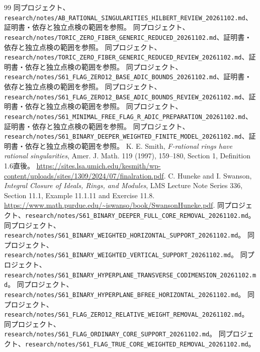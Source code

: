 \documentclass[11pt,a4paper]{ltjsarticle}
\theoremstyle{remark}
\begin{document}
\begin{thebibliography}{99}
 同プロジェクト、\nolinkurl{research/notes/AB_RATIONAL_SINGULARITIES_HILBERT_REVIEW_20261102.md}、証明書・依存と独立点検の範囲を参照。
 同プロジェクト、\nolinkurl{research/notes/TORIC_ZERO_FIBER_GENERIC_REDUCED_20261102.md}、証明書・依存と独立点検の範囲を参照。
 同プロジェクト、\nolinkurl{research/notes/TORIC_ZERO_FIBER_GENERIC_REDUCED_REVIEW_20261102.md}、証明書・依存と独立点検の範囲を参照。
 同プロジェクト、\nolinkurl{research/notes/S61_FLAG_ZERO12_BASE_ADIC_BOUNDS_20261102.md}、証明書・依存と独立点検の範囲を参照。
 同プロジェクト、\nolinkurl{research/notes/S61_FLAG_ZERO12_BASE_ADIC_BOUNDS_REVIEW_20261102.md}、証明書・依存と独立点検の範囲を参照。
 同プロジェクト、\nolinkurl{research/notes/S61_MINIMAL_FREE_FLAG_R_ADIC_PREPARATION_20261102.md}、証明書・依存と独立点検の範囲を参照。
 同プロジェクト、\nolinkurl{research/notes/S61_BINARY_DEEPER_WEIGHTED_FINITE_MODEL_20261102.md}、証明書・依存と独立点検の範囲を参照。
 K. E. Smith, \textit{F-rational rings have rational singularities},
Amer. J. Math. 119 (1997), 159--180, Section 1, Definition 1.6直後。
\url{https://sites.lsa.umich.edu/kesmith/wp-content/uploads/sites/1309/2024/07/finalration.pdf}.
 C. Huneke and I. Swanson,
\textit{Integral Closure of Ideals, Rings, and Modules}, LMS Lecture Note Series 336,
Section 11.1, Example 11.1.11 and Exercise 11.8.
\url{https://www.math.purdue.edu/~iswanso/book/SwansonHuneke.pdf}.
 同プロジェクト、\nolinkurl{research/notes/S61_BINARY_DEEPER_FULL_CORE_REMOVAL_20261102.md}。
 同プロジェクト、\nolinkurl{research/notes/S61_BINARY_WEIGHTED_HORIZONTAL_SUPPORT_20261102.md}。
 同プロジェクト、\nolinkurl{research/notes/S61_BINARY_WEIGHTED_VERTICAL_SUPPORT_20261102.md}。
 同プロジェクト、\nolinkurl{research/notes/S61_BINARY_HYPERPLANE_TRANSVERSE_CODIMENSION_20261102.md}。
 同プロジェクト、\nolinkurl{research/notes/S61_BINARY_HYPERPLANE_BFREE_HORIZONTAL_20261102.md}。
 同プロジェクト、\nolinkurl{research/notes/S61_FLAG_ZERO12_RELATIVE_WEIGHT_REMOVAL_20261102.md}。
 同プロジェクト、\nolinkurl{research/notes/S61_FLAG_ORDINARY_CORE_SUPPORT_20261102.md}。
 同プロジェクト、\nolinkurl{research/notes/S61_FLAG_TRUE_CORE_WEIGHTED_REMOVAL_20261102.md}。

\end{thebibliography}
\end{document}
